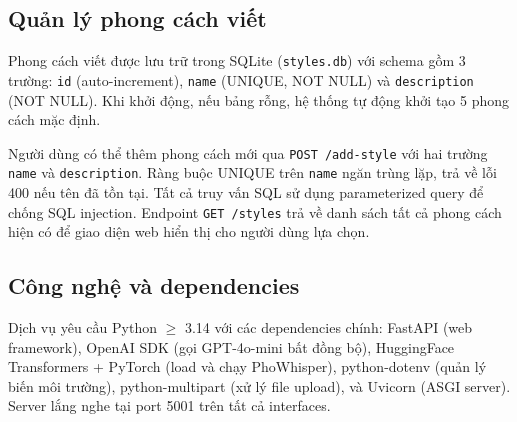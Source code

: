 {\subsection{Quản lý phong cách viết}

Phong cách viết được lưu trữ trong SQLite (\texttt{styles.db}) với schema
gồm 3 trường: \texttt{id} (auto-increment), \texttt{name} (UNIQUE, NOT NULL)
và \texttt{description} (NOT NULL). Khi khởi động, nếu bảng rỗng, hệ thống
tự động khởi tạo 5 phong cách mặc định.

Người dùng có thể thêm phong cách mới qua \texttt{POST /add-style} với
hai trường \texttt{name} và \texttt{description}. Ràng buộc UNIQUE trên
\texttt{name} ngăn trùng lặp, trả về lỗi 400 nếu tên đã tồn tại.
Tất cả truy vấn SQL sử dụng parameterized query để chống SQL injection.
Endpoint \texttt{GET /styles} trả về danh sách tất cả phong cách hiện có
để giao diện web hiển thị cho người dùng lựa chọn.

\subsection{Công nghệ và dependencies}

Dịch vụ yêu cầu Python $\geq$ 3.14 với các dependencies chính: FastAPI
(web framework), OpenAI SDK (gọi GPT-4o-mini bất đồng bộ), HuggingFace
Transformers + PyTorch (load và chạy PhoWhisper), python-dotenv (quản lý
biến môi trường), python-multipart (xử lý file upload), và Uvicorn
(ASGI server). Server lắng nghe tại port 5001 trên tất cả interfaces.

}%
